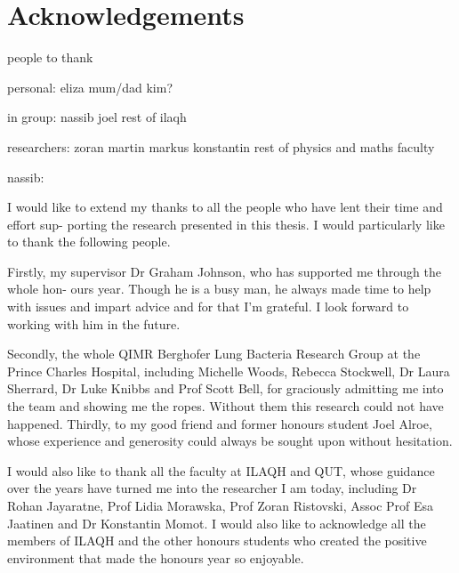 




\chapter*{Acknowledgements}
\label{ch:ackn}

people to thank

personal:
eliza
mum/dad
kim?

in group:
nassib
joel
rest of ilaqh

researchers:
zoran
martin
markus
konstantin
rest of physics and maths faculty



nassib:

I would like to extend my thanks to all the people who have lent their time and effort sup- porting the research presented in this thesis. I would particularly like to thank the following people.

Firstly, my supervisor Dr Graham Johnson, who has supported me through the whole hon- ours year. Though he is a busy man, he always made time to help with issues and impart advice and for that I’m grateful. I look forward to working with him in the future.

Secondly, the whole QIMR Berghofer Lung Bacteria Research Group at the Prince Charles Hospital, including Michelle Woods, Rebecca Stockwell, Dr Laura Sherrard, Dr Luke Knibbs and Prof Scott Bell, for graciously admitting me into the team and showing me the ropes. Without them this research could not have happened.
Thirdly, to my good friend and former honours student Joel Alroe, whose experience and generosity could always be sought upon without hesitation.

I would also like to thank all the faculty at ILAQH and QUT, whose guidance over the years have turned me into the researcher I am today, including Dr Rohan Jayaratne, Prof Lidia Morawska, Prof Zoran Ristovski, Assoc Prof Esa Jaatinen and Dr Konstantin Momot. I would also like to acknowledge all the members of ILAQH and the other honours students who created the positive environment that made the honours year so enjoyable.



